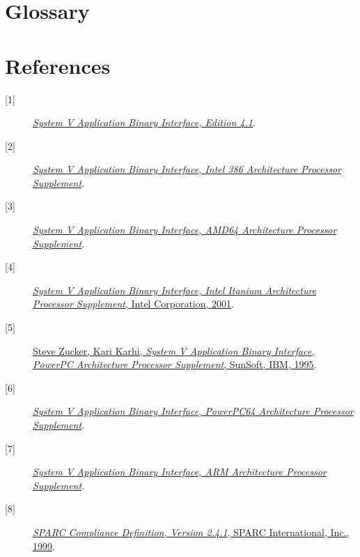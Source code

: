 \documentclass[twoside]{article}
\begin{document}
\begin{appendix}

\section{Glossary}
\printglossary

\section{References}

\begin{description}
\item[\textrm{[1]}]
\href{http://www.caldera.com/developers/devspecs/gabi41.pdf}%
{\sl System V Application Binary Interface, Edition 4.1}.

\item[\textrm{[2]}]
\href{http://www.caldera.com/developers/devspecs/abi386-4.pdf}%
{\sl System V Application Binary Interface, Intel 386 Architecture Processor
Supplement}.

\item[\textrm{[3]}]
\href{http://www.x86-64.org/cgi-bin/cvsweb.cgi/x86-64-ABI/}%
{\sl System V Application Binary Interface, AMD64 Architecture Processor
Supplement}.

\item[\textrm{[4]}]
\href{http://refspecs.freestandards.org/elf/IA64-SysV-psABI.pdf}%
{{\sl System V Application Binary Interface, Intel Itanium Architecture Processor
Supplement}, Intel Corporation, 2001}.

\item[\textrm{[5]}]
\href{http://refspecs.freestandards.org/elf/elfspec_ppc.pdf}%
{Steve Zucker, Kari Karhi, {\sl System V Application Binary Interface,
PowerPC Architecture Processor Supplement}, SunSoft, IBM, 1995}.

\item[\textrm{[6]}]
\href{ftp://ftp.linuxppc64.org/pub/people/amodra/PPC-elf64abi.txt.gz}%
{\sl System V Application Binary Interface, PowerPC64 Architecture Processor
Supplement}.

\item[\textrm{[7]}]
\href{http://www.arm.com/support/566FHT/$File/ARMELF.pdf}%
{\sl System V Application Binary Interface, ARM Architecture Processor
Supplement}.

\item[\textrm{[8]}]
\href{http://www.sparc.com/standards/SCD.2.4.1.ps.Z}%
{{\sl SPARC Compliance Definition, Version 2.4.1},
SPARC International, Inc., 1999}.


\end{description}
\end{appendix}
\end{document}
